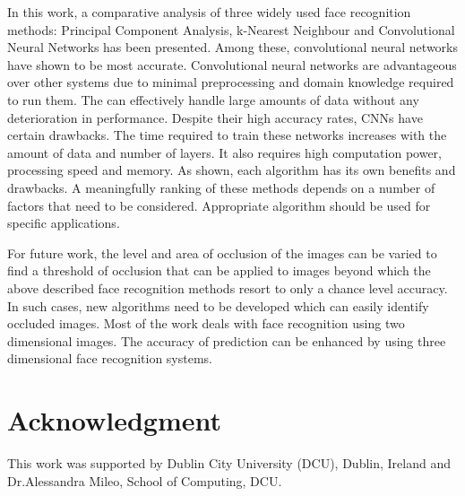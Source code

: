 \documentclass[conference]{IEEEtran}
\begin{document}
In this work, a comparative analysis of three widely used face recognition methods: Principal Component Analysis, k-Nearest Neighbour and Convolutional Neural Networks has been presented. Among these, convolutional neural networks have shown to be most accurate. Convolutional neural networks are advantageous over other systems due to minimal preprocessing and domain knowledge required to run them. The can effectively handle large amounts of data without any deterioration in performance. Despite their high accuracy rates, CNNs have certain drawbacks. The time required to train these networks increases with the amount of data and number of layers. It also requires high computation power, processing speed and memory. As shown, each algorithm has its own benefits and drawbacks. A meaningfully ranking of these methods depends on a number of factors that need to be considered. Appropriate algorithm should be used for specific applications. 

For future work, the level and area of occlusion of the images can be varied to find a threshold of occlusion that can be applied to images beyond which the above described face recognition methods resort to only a chance level accuracy. In such cases, new algorithms need to be developed which can easily identify occluded images. Most of the work deals with face recognition using two dimensional images. The accuracy of prediction can be enhanced by using three dimensional face recognition systems.


\section*{Acknowledgment}
This work was supported by Dublin City University (DCU), Dublin, Ireland and Dr.Alessandra Mileo, School of Computing, DCU.



\end{document}

